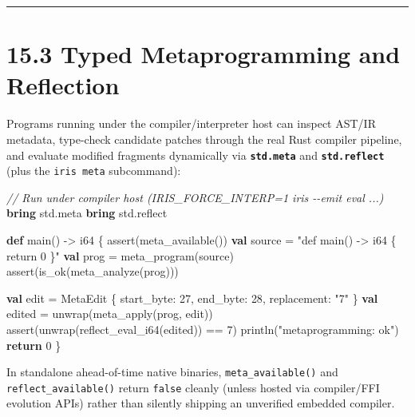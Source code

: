 \documentclass[
  english,
  oneside]{book}
\newenvironment{Shaded}{\begin{snugshade}}{\end{snugshade}}
\newcommand{\CommentTok}[1]{\textcolor[rgb]{0.42,0.60,0.33}{\textit{#1}}}
\newcommand{\ControlFlowTok}[1]{\textcolor[rgb]{0.77,0.53,0.75}{\textbf{#1}}}
\newcommand{\DataTypeTok}[1]{\textcolor[rgb]{0.31,0.79,0.69}{#1}}
\newcommand{\DecValTok}[1]{\textcolor[rgb]{0.71,0.81,0.66}{#1}}
\newcommand{\FunctionTok}[1]{\textcolor[rgb]{0.86,0.86,0.67}{#1}}
\newcommand{\KeywordTok}[1]{\textcolor[rgb]{0.34,0.61,0.84}{\textbf{#1}}}
\newcommand{\NormalTok}[1]{\textcolor[rgb]{0.83,0.83,0.83}{#1}}
\newcommand{\OperatorTok}[1]{\textcolor[rgb]{0.83,0.83,0.83}{#1}}
\newcommand{\StringTok}[1]{\textcolor[rgb]{0.81,0.57,0.47}{#1}}
\begin{document}
\begin{center}\rule{0.5\linewidth}{0.5pt}\end{center}

\section{15.3 Typed Metaprogramming and
Reflection}\label{typed-metaprogramming-and-reflection}

Programs running under the compiler/interpreter host can inspect AST/IR
metadata, type-check candidate patches through the real Rust compiler
pipeline, and evaluate modified fragments dynamically via
\textbf{\texttt{std.meta}} and \textbf{\texttt{std.reflect}} (plus the
\texttt{iris\ meta} subcommand):

\begin{Shaded}
\begin{Highlighting}[]
\CommentTok{// Run under compiler host (\textasciigrave{}IRIS\_FORCE\_INTERP=1 iris {-}{-}emit eval ...\textasciigrave{})}
\KeywordTok{bring}\NormalTok{ std}\OperatorTok{.}\NormalTok{meta}
\KeywordTok{bring}\NormalTok{ std}\OperatorTok{.}\NormalTok{reflect}

\KeywordTok{def}\NormalTok{ main() }\OperatorTok{{-}\textgreater{}} \DataTypeTok{i64}\NormalTok{ \{}
    \FunctionTok{assert}\NormalTok{(meta\_available())}
    \KeywordTok{val}\NormalTok{ source }\OperatorTok{=} \StringTok{"def main() {-}\textgreater{} i64 \{ return 0 \}"}
    \KeywordTok{val}\NormalTok{ prog }\OperatorTok{=}\NormalTok{ meta\_program(source)}
    \FunctionTok{assert}\NormalTok{(}\FunctionTok{is\_ok}\NormalTok{(meta\_analyze(prog)))}

    \KeywordTok{val}\NormalTok{ edit }\OperatorTok{=}\NormalTok{ MetaEdit \{ start\_byte: }\DecValTok{27}\NormalTok{, end\_byte: }\DecValTok{28}\NormalTok{, replacement: }\StringTok{"7"}\NormalTok{ \}}
    \KeywordTok{val}\NormalTok{ edited }\OperatorTok{=}\NormalTok{ unwrap(meta\_apply(prog, edit))}
    \FunctionTok{assert}\NormalTok{(unwrap(reflect\_eval\_i64(edited)) }\OperatorTok{==} \DecValTok{7}\NormalTok{)}
\NormalTok{    println(}\StringTok{"metaprogramming: ok"}\NormalTok{)}
    \ControlFlowTok{return} \DecValTok{0}
\NormalTok{\}}
\end{Highlighting}
\end{Shaded}

In standalone ahead-of-time native binaries, \texttt{meta\_available()}
and \texttt{reflect\_available()} return \texttt{false} cleanly (unless
hosted via compiler/FFI evolution APIs) rather than silently shipping an
unverified embedded compiler.
\end{document}
